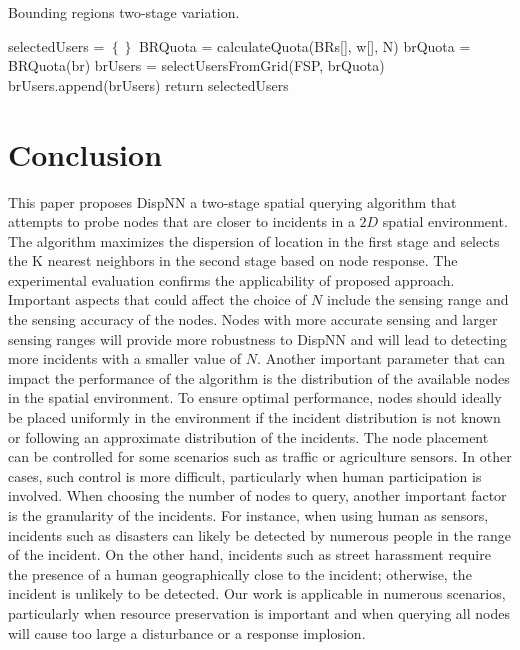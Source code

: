 \documentclass{acm_proc_article-sp}
\begin{document}
\begin{algorithm}
\caption{Bounding regions two-stage variation.}
\label{TSBR}
\begin{algorithmic}[1]
  \State selectedUsers = $\left\{\right\}$
   \State BRQuota = calculateQuota(BRs[], w[], N) 
    \State brQuota = BRQuota(br)
  \State brUsers = selectUsersFromGrid(FSP, brQuota)
  \State brUsers.append(brUsers)
\EndFor
\State return {selectedUsers}
\EndFunction
\end{algorithmic}
\end{algorithm}
\section{Conclusion}
This paper proposes DispNN a two-stage spatial querying algorithm that attempts to probe nodes that are closer to incidents in a $2D$ spatial environment. The algorithm maximizes the dispersion of location in the first stage and selects the K nearest neighbors in the second stage based on node response. The experimental evaluation confirms the applicability of proposed approach.
Important aspects that could affect the choice of $N$ include the sensing range and the sensing accuracy of the nodes. Nodes with more accurate sensing and larger sensing ranges will provide more robustness to DispNN and will lead to detecting more incidents with a smaller value of $N$. Another important parameter that can impact the performance of the algorithm is the distribution of the available nodes in the spatial environment. To ensure optimal performance, nodes should ideally be placed uniformly in the environment if the incident distribution is not known or following an approximate distribution of the incidents. The node placement can be controlled for some scenarios such as traffic or agriculture sensors. In other cases, such control is more difficult, particularly when human participation is involved. When choosing the number of nodes to query, another important factor is the granularity of the incidents. For instance, when using human as sensors, incidents such as disasters can likely be detected by numerous people in the range of the incident. On the other hand, incidents such as street harassment require the presence of a human geographically close to the incident; otherwise, the incident is unlikely to be detected. Our work is applicable in numerous scenarios, particularly when resource preservation is important and when querying all nodes will cause too large a disturbance or a response implosion.  
\end{document}
